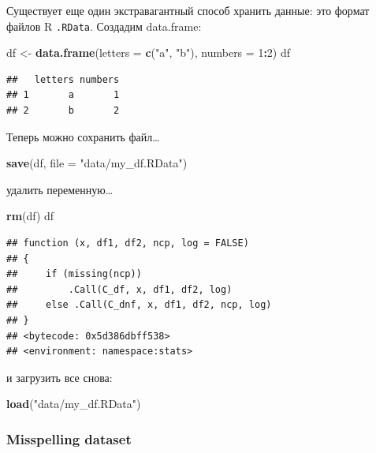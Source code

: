 \documentclass[]{book}
\newenvironment{Shaded}{\begin{snugshade}}{\end{snugshade}}
\newcommand{\DataTypeTok}[1]{\textcolor[rgb]{0.13,0.29,0.53}{#1}}
\newcommand{\DecValTok}[1]{\textcolor[rgb]{0.00,0.00,0.81}{#1}}
\newcommand{\KeywordTok}[1]{\textcolor[rgb]{0.13,0.29,0.53}{\textbf{#1}}}
\newcommand{\NormalTok}[1]{#1}
\newcommand{\OperatorTok}[1]{\textcolor[rgb]{0.81,0.36,0.00}{\textbf{#1}}}
\newcommand{\StringTok}[1]{\textcolor[rgb]{0.31,0.60,0.02}{#1}}
\begin{document}
Существует еще один экстравагантный способ хранить данные: это формат файлов R \texttt{.RData}. Создадим data.frame:

\begin{Shaded}
\begin{Highlighting}[]
\NormalTok{df <-}\StringTok{ }\KeywordTok{data.frame}\NormalTok{(}\DataTypeTok{letters =} \KeywordTok{c}\NormalTok{(}\StringTok{"a"}\NormalTok{, }\StringTok{"b"}\NormalTok{),}
                 \DataTypeTok{numbers =} \DecValTok{1}\OperatorTok{:}\DecValTok{2}\NormalTok{)}
\NormalTok{df}
\end{Highlighting}
\end{Shaded}

\begin{verbatim}
##   letters numbers
## 1       a       1
## 2       b       2
\end{verbatim}

Теперь можно сохранить файл\ldots{}

\begin{Shaded}
\begin{Highlighting}[]
\KeywordTok{save}\NormalTok{(df, }\DataTypeTok{file =} \StringTok{"data/my_df.RData"}\NormalTok{)}
\end{Highlighting}
\end{Shaded}

удалить переменную\ldots{}

\begin{Shaded}
\begin{Highlighting}[]
\KeywordTok{rm}\NormalTok{(df)}
\NormalTok{df}
\end{Highlighting}
\end{Shaded}

\begin{verbatim}
## function (x, df1, df2, ncp, log = FALSE) 
## {
##     if (missing(ncp)) 
##         .Call(C_df, x, df1, df2, log)
##     else .Call(C_dnf, x, df1, df2, ncp, log)
## }
## <bytecode: 0x5d386dbff538>
## <environment: namespace:stats>
\end{verbatim}

и загрузить все снова:

\begin{Shaded}
\begin{Highlighting}[]
\KeywordTok{load}\NormalTok{(}\StringTok{"data/my_df.RData"}\NormalTok{)}
\end{Highlighting}
\end{Shaded}

\hypertarget{misspelling-dataset}{%
\subsubsection{Misspelling dataset}\label{misspelling-dataset}}
\end{document}

